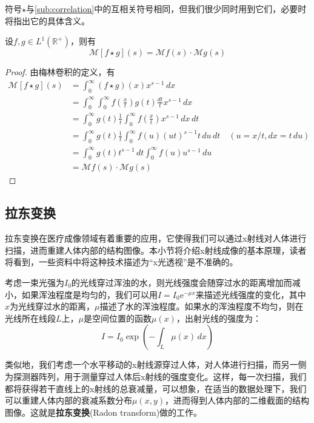 符号$\star$与\ref{sub:correlation}中的互相关符号相同，但我们很少同时用到它们，必要时将指出它的具体含义。


\begin{proposition}[梅林卷积的变换性质]
    设$f,g\in L^1(\mathbb{R}^+)$，则有
    \[\mathcal{M} [f\star g](s)=\mathcal{M} f(s)\cdot \mathcal{M} g(s)\]
\end{proposition}
\begin{proof}
    由梅林卷积的定义，有
    \begin{align*}
        \mathcal{M} [f\star g](s)&=\int_0^{\infty}(f\star g)(x)x^{s-1}\,dx\\
        &=\int_0^{\infty}\int_0^{\infty}f\left(\frac{x}{t}\right)g(t)\frac{dt}{t}x^{s-1}\,dx\\
        &=\int_0^{\infty}g(t)\frac{1}{t}\int_0^{\infty}f\left(\frac{x}{t}\right)x^{s-1}\,dx\,dt\\
        &=\int_0^{\infty}g(t)\frac{1}{t}\int_0^{\infty}f(u)(ut)^{s-1}t\,du\,dt\quad (u=x/t,dx=t\,du)\\
        &=\int_0^{\infty}g(t)t^{s-1}\,dt\int_0^{\infty}f(u)u^{s-1}\,du\\
        &=\mathcal{M} f(s)\cdot \mathcal{M} g(s)
    \end{align*}
\end{proof}

\subsection{拉东变换}\label{sub:radon}

拉东变换在医疗成像领域有着重要的应用，它使得我们可以通过x射线对人体进行扫描，进而重建人体内部的结构图像。本小节将介绍x射线成像的基本原理，读者将看到，一些资料中将这种技术描述为“x光透视”是不准确的。

考虑一束光强为$I_0$的光线穿过浑浊的水，则光线强度会随穿过水的距离增加而减小，如果浑浊程度是均匀的，我们可以用$I=I_0 \mathrm{e}^{-\mu x}$来描述光线强度的变化，其中$x$为光线穿过水的距离，$\mu$描述了水的浑浊程度。如果水的浑浊程度不均匀，则在光线所在线段$L$上，$\mu$是空间位置的函数$\mu(x)$，出射光线的强度为：
\[I=I_0 \exp\left(-\int_{L}\mu(x)\,dx\right)\]

类似地，我们考虑一个水平移动的x射线源穿过人体，对人体进行扫描，而另一侧为探测器阵列，用于测量穿过人体后x射线的强度变化。这样，每一次扫描，我们都将获得若干直线上的x射线的总衰减量，可以想象，在适当的数据处理下，我们可以重建人体内部的衰减系数分布$\mu(x,y)$，进而得到人体内部的二维截面的结构图像。这就是\textbf{拉东变换}(Radon transform)做的工作。

